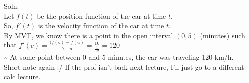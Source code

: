\documentclass{letter}
\begin{document}
	Soln:\\
	Let $f(t)$ be the position function of the car at time $t$.\\
	So, $f'(t)$ is the velocity function of the car at time $t$.\\
	
	By MVT, we know there is a point in the open interval $(0, 5)$ (minutes) such that $f'(c) = \frac{(f(b)-f(a)}{b-a} = \frac{10}{\frac{1}{12}} = 120$\\
	$\therefore$ At some point between 0 and 5 minutes, the car was traveling 120 km/h.\\
	
	Short note again :/ If the prof isn't back next lecture, I'll just go to a different calc lecture.
\end{document}
